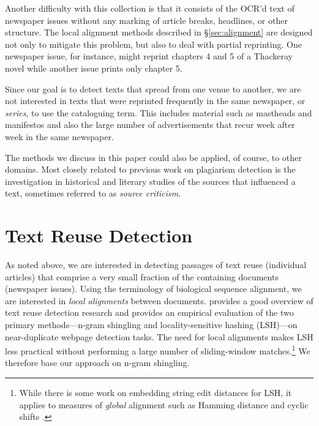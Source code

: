 \documentclass[pdftex,11pt]{article}
\begin{document}
Another difficulty with this collection is that it consists of the
OCR'd text of newspaper issues without any marking of article breaks,
headlines, or other structure.  The local alignment methods described
in \S\ref{sec:alignment} are designed not only to mitigate this
problem, but also to deal with partial reprinting.  One newspaper
issue, for instance, might reprint chapters 4 and 5 of a Thackeray
novel while another issue prints only chapter 5.

Since our goal is to detect texts that spread from one venue to
another, we are not interested in texts that were reprinted frequently
in the same newspaper, or \textit{series}, to use the cataloguing
term.  This includes material such as mastheads and manifestos and
also the large number of advertisements that recur week after week in
the same newspaper.

The methods we discuss in this paper could also be applied, of course,
to other domains.  Most closely related to previous work on plagiarism
detection is the investigation in historical and literary studies of
the sources that influenced a text, sometimes referred to as
\emph{source criticism}.

\section{Text Reuse Detection}
\label{sec:detection}

As noted above, we are interested in detecting passages of text reuse
(individual articles) that comprise a very small fraction of the
containing documents (newspaper issues).  Using the terminology of
biological sequence alignment, we are interested in \emph{local
  alignments} between documents.
\citet{henzinger06:_findin_near_duplic_web_pages} provides a good
overview of text reuse detection research and provides an empirical
evaluation of the two primary methods---n-gram shingling and
locality-sensitive hashing (LSH)---on near-duplicate webpage detection
tasks.  The need for local alignments makes LSH less practical without
performing a large number of sliding-window matches.\footnote{While
  there is some work on embedding string edit distances for LSH, it
  applies to measures of \emph{global} alignment such as Hamming
  distance and cyclic shifts \cite{andoni13:_homom_finger_misal}.} We
therefore base our approach on n-gram shingling.
\end{document}
